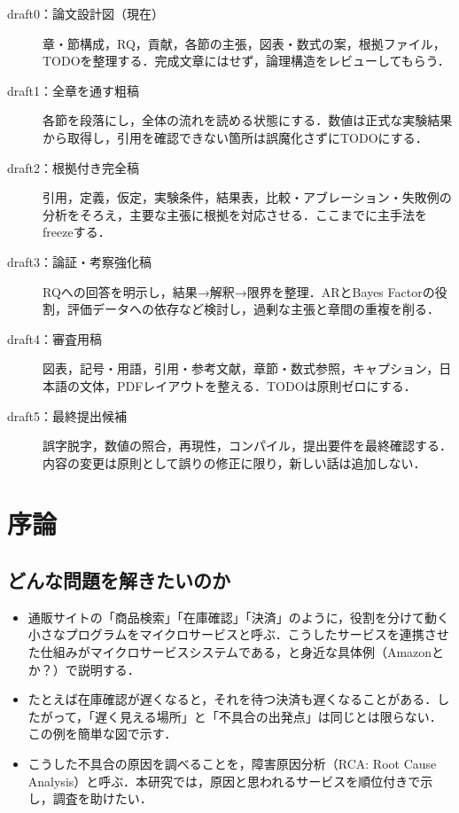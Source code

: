 \begin{description}
    \item[draft0：論文設計図（現在）]
    章・節構成，RQ，貢献，各節の主張，図表・数式の案，根拠ファイル，TODOを整理する．完成文章にはせず，論理構造をレビューしてもらう．
    \item[draft1：全章を通す粗稿]
    各節を段落にし，全体の流れを読める状態にする．数値は正式な実験結果から取得し，引用を確認できない箇所は誤魔化さずにTODOにする．
    \item[draft2：根拠付き完全稿]
    引用，定義，仮定，実験条件，結果表，比較・アブレーション・失敗例の分析をそろえ，主要な主張に根拠を対応させる．ここまでに主手法をfreezeする．
    \item[draft3：論証・考察強化稿]
    RQへの回答を明示し，結果→解釈→限界を整理．ARとBayes Factorの役割，評価データへの依存など検討し，過剰な主張と章間の重複を削る．
    \item[draft4：審査用稿]
    図表，記号・用語，引用・参考文献，章節・数式参照，キャプション，日本語の文体，PDFレイアウトを整える．TODOは原則ゼロにする．
    \item[draft5：最終提出候補]
    誤字脱字，数値の照合，再現性，コンパイル，提出要件を最終確認する．内容の変更は原則として誤りの修正に限り，新しい話は追加しない．
\end{description}

\clearpage
{}

\section{序論}
\label{sec:intro}

\subsection{どんな問題を解きたいのか}
\begin{itemize}
    \item 通販サイトの「商品検索」「在庫確認」「決済」のように，役割を分けて動く小さなプログラムをマイクロサービスと呼ぶ．こうしたサービスを連携させた仕組みがマイクロサービスシステムである，と身近な具体例（Amazonとか？）で説明する．
    \item たとえば在庫確認が遅くなると，それを待つ決済も遅くなることがある．したがって，「遅く見える場所」と「不具合の出発点」は同じとは限らない．この例を簡単な図で示す．
    \item こうした不具合の原因を調べることを，障害原因分析（RCA: Root Cause Analysis）と呼ぶ．本研究では，原因と思われるサービスを順位付きで示し，調査を助けたい．
\end{itemize}

